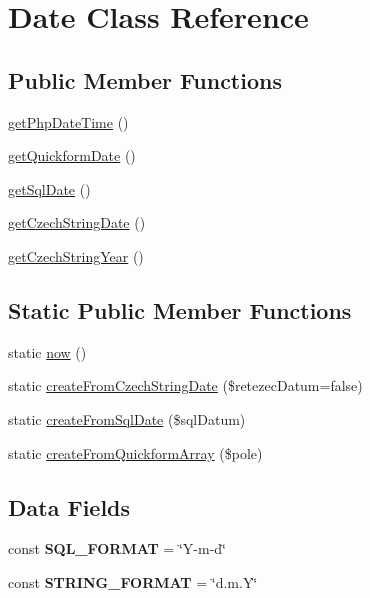 \hypertarget{class_pes_1_1_type_1_1_date}{}\section{Date Class Reference}
\label{class_pes_1_1_type_1_1_date}
\subsection*{Public Member Functions}
\begin{DoxyCompactItemize}
\item 
\mbox{\hyperlink{class_pes_1_1_type_1_1_date_a59cfeb98da819352b75ba73269469726}{get\+Php\+Date\+Time}} ()
\item 
\mbox{\hyperlink{class_pes_1_1_type_1_1_date_a34148c99daa1f26eb7ba41e38f585b48}{get\+Quickform\+Date}} ()
\item 
\mbox{\hyperlink{class_pes_1_1_type_1_1_date_a88025aaf181d1703946b116b8d32a270}{get\+Sql\+Date}} ()
\item 
\mbox{\hyperlink{class_pes_1_1_type_1_1_date_aed10fcc22bc0e41c4fa06292016297f4}{get\+Czech\+String\+Date}} ()
\item 
\mbox{\hyperlink{class_pes_1_1_type_1_1_date_a5203259eabfb8390c55644f069cf50dd}{get\+Czech\+String\+Year}} ()
\end{DoxyCompactItemize}
\subsection*{Static Public Member Functions}
\begin{DoxyCompactItemize}
\item 
static \mbox{\hyperlink{class_pes_1_1_type_1_1_date_af1e393aa6d7074ae6ddc34df2ed39c03}{now}} ()
\item 
static \mbox{\hyperlink{class_pes_1_1_type_1_1_date_a1e6beffe36efe1c6fd1a81c67dca04bf}{create\+From\+Czech\+String\+Date}} (\$retezec\+Datum=false)
\item 
static \mbox{\hyperlink{class_pes_1_1_type_1_1_date_a3a426b05a315cf4ea83224984a675344}{create\+From\+Sql\+Date}} (\$sql\+Datum)
\item 
static \mbox{\hyperlink{class_pes_1_1_type_1_1_date_aa8f285391dc63530f78a35c9e3ec0dee}{create\+From\+Quickform\+Array}} (\$pole)
\end{DoxyCompactItemize}
\subsection*{Data Fields}
\begin{DoxyCompactItemize}
\item 
\mbox{\label{class_pes_1_1_type_1_1_date_a19d0e865e523d457d83191d23ba1d89b}} 
const {\bfseries S\+Q\+L\+\_\+\+F\+O\+R\+M\+AT} = \char`\"{}Y-\/m-\/d\char`\"{}
\item 
\mbox{\label{class_pes_1_1_type_1_1_date_a6f1d8f1fb2c6b1c6afe4ca45fdf6494e}} 
const {\bfseries S\+T\+R\+I\+N\+G\+\_\+\+F\+O\+R\+M\+AT} = \char`\"{}d.\+m.\+Y\char`\"{}
\end{DoxyCompactItemize}


